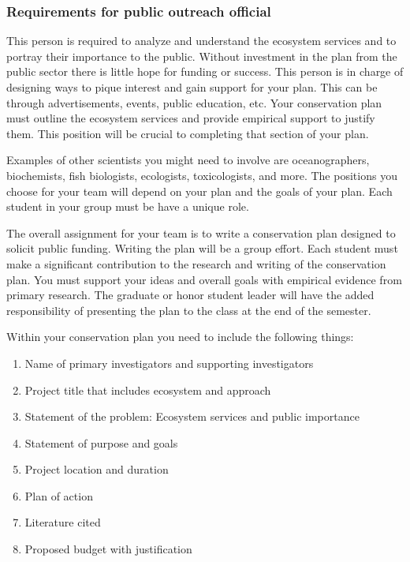 \documentclass[12pt, hidelinks]{exam}
\begin{document}
\subsubsection*{Requirements for public outreach official}

This person is required to analyze and understand the ecosystem
services and to portray their importance to the public. Without
investment in the plan from the public sector there is little hope for
funding or success. This person is in charge of designing ways to
pique interest and gain support for your plan. This can be through advertisements, events,
public education, etc. Your conservation plan must outline the ecosystem services and provide
empirical support to justify them. This position will be crucial to
completing that section of your plan.

Examples of other scientists you might need to involve are
oceanographers, biochemists, fish biologists, ecologists, toxicologists,
and more. The positions you choose for your team will depend on your plan and the goals of your plan. Each student in your group must be have a unique role.

The overall assignment for your team is to write a conservation plan designed to solicit public funding. Writing the plan will be a group effort. Each student must make a significant contribution
to the research and writing of the conservation plan. You must support your ideas and overall
goals with empirical evidence from primary research. The graduate or honor student leader will have the
added responsibility of presenting the plan to the class at the end of the semester. 

Within your conservation plan you need to include the following things:

\begin{enumerate}
\def\labelenumi{\arabic{enumi}.}
\item
  Name of primary investigators and supporting investigators
\item
  Project title that includes ecosystem and approach
\item
  Statement of the problem: Ecosystem services and public importance
\item
  Statement of purpose and goals
\item
  Project location and duration
\item
  Plan of action
\item
  Literature cited
\item
  Proposed budget with justification
\end{enumerate}
\end{document}
